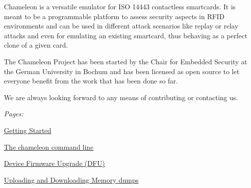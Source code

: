 Chameleon is a versatile emulator for I\-S\-O 14443 contactless smartcards. It is meant to be a programmable platform to assess security aspects in R\-F\-I\-D environments and can be used in different attack scenarios like replay or relay attacks and even for emulating an existing smartcard, thus behaving as a perfect clone of a given card.

The Chameleon Project has been started by the Chair for Embedded Security at the German University in Bochum and has been licensed as open source to let everyone benefit from the work that has been done so far.

We are always looking forward to any means of contributing or contacting us.

{\itshape Pages\-:}
\begin{DoxyItemize}
\item \hyperlink{Page_GettingStarted}{Getting Started}
\item \hyperlink{Page_CommandLine}{The chameleon command line}
\item \hyperlink{Page_FirmwareUpgrade}{Device Firmware Upgrade (D\-F\-U)}
\item \hyperlink{Page_UploadingDownloading}{Uploading and Downloading Memory dumps} 
\end{DoxyItemize}